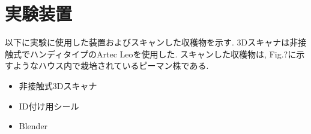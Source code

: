 \section{実験装置}
以下に実験に使用した装置およびスキャンした収穫物を示す.
3Dスキャナは非接触式でハンディタイプのArtec Leoを使用した.
スキャンした収穫物は, Fig.?に示すようなハウス内で栽培されているピーマン株である.
\begin{itemize}
  \item 非接触式3Dスキャナ
  \item ID付け用シール
  \item Blender
\end{itemize}